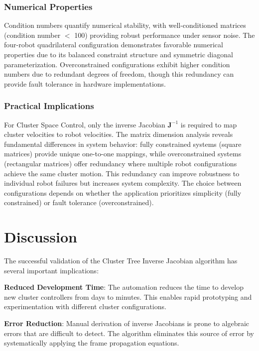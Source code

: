 \documentclass[lettersize,journal]{IEEEtran}
\begin{document}
\subsubsection{Numerical Properties}

Condition numbers quantify numerical stability, with well-conditioned matrices (condition number $<$ 100) providing robust performance under sensor noise. The four-robot quadrilateral configuration demonstrates favorable numerical properties due to its balanced constraint structure and symmetric diagonal parameterization. Overconstrained configurations exhibit higher condition numbers due to redundant degrees of freedom, though this redundancy can provide fault tolerance in hardware implementations.

\subsubsection{Practical Implications}

For Cluster Space Control, only the inverse Jacobian $\mathbf{J}^{-1}$ is required to map cluster velocities to robot velocities. The matrix dimension analysis reveals fundamental differences in system behavior: fully constrained systems (square matrices) provide unique one-to-one mappings, while overconstrained systems (rectangular matrices) offer redundancy where multiple robot configurations achieve the same cluster motion. This redundancy can improve robustness to individual robot failures but increases system complexity. The choice between configurations depends on whether the application prioritizes simplicity (fully constrained) or fault tolerance (overconstrained).

\section{Discussion}

The successful validation of the Cluster Tree Inverse Jacobian algorithm has several important implications:

\textbf{Reduced Development Time}: The automation reduces the time to develop new cluster controllers from days to minutes. This enables rapid prototyping and experimentation with different cluster configurations.

\textbf{Error Reduction}: Manual derivation of inverse Jacobians is prone to algebraic errors that are difficult to detect. The algorithm eliminates this source of error by systematically applying the frame propagation equations.
\end{document}
